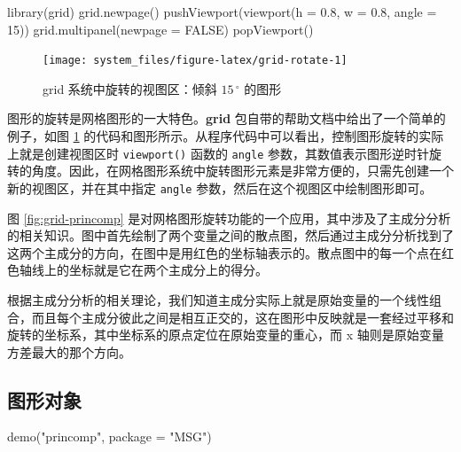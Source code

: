 \documentclass[
  b5paper,
  UTF8,twoside]{book}
\newenvironment{Shaded}{\begin{snugshade}}{\end{snugshade}}
\newcommand{\AttributeTok}[1]{\textcolor[rgb]{0.77,0.63,0.00}{#1}}
\newcommand{\ConstantTok}[1]{\textcolor[rgb]{0.00,0.00,0.00}{#1}}
\newcommand{\DecValTok}[1]{\textcolor[rgb]{0.00,0.00,0.81}{#1}}
\newcommand{\FloatTok}[1]{\textcolor[rgb]{0.00,0.00,0.81}{#1}}
\newcommand{\FunctionTok}[1]{\textcolor[rgb]{0.00,0.00,0.00}{#1}}
\newcommand{\NormalTok}[1]{#1}
\newcommand{\StringTok}[1]{\textcolor[rgb]{0.31,0.60,0.02}{#1}}
\begin{document}
\begin{Shaded}
\begin{Highlighting}[]
\FunctionTok{library}\NormalTok{(grid)}
\FunctionTok{grid.newpage}\NormalTok{()}
\FunctionTok{pushViewport}\NormalTok{(}\FunctionTok{viewport}\NormalTok{(}\AttributeTok{h =} \FloatTok{0.8}\NormalTok{, }\AttributeTok{w =} \FloatTok{0.8}\NormalTok{, }\AttributeTok{angle =} \DecValTok{15}\NormalTok{))}
\FunctionTok{grid.multipanel}\NormalTok{(}\AttributeTok{newpage =} \ConstantTok{FALSE}\NormalTok{)}
\FunctionTok{popViewport}\NormalTok{()}
\end{Highlighting}
\end{Shaded}

\begin{figure}

{\centering \texttt{[image: system\_files/figure-latex/grid-rotate-1]} 

}

\caption[grid 系统中旋转的视图区]{grid 系统中旋转的视图区：倾斜 \(15\,^{\circ}\) 的图形}\label{fig:grid-rotate}
\end{figure}





图形的旋转是网格图形的一大特色。\textbf{grid} 包自带的帮助文档中给出了一个简单的例子，如图 \ref{fig:grid-rotate} 的代码和图形所示。从程序代码中可以看出，控制图形旋转的实际上就是创建视图区时 \texttt{viewport()} 函数的 \texttt{angle} 参数，其数值表示图形逆时针旋转的角度。因此，在网格图形系统中旋转图形元素是非常方便的，只需先创建一个新的视图区，并在其中指定 \texttt{angle} 参数，然后在这个视图区中绘制图形即可。

图 \ref{fig:grid-princomp} 是对网格图形旋转功能的一个应用，其中涉及了主成分分析的相关知识。图中首先绘制了两个变量之间的散点图，然后通过主成分分析找到了这两个主成分的方向，在图中是用红色的坐标轴表示的。散点图中的每一个点在红色轴线上的坐标就是它在两个主成分上的得分。

根据主成分分析的相关理论，我们知道主成分实际上就是原始变量的一个线性组合，而且每个主成分彼此之间是相互正交的，这在图形中反映就是一套经过平移和旋转的坐标系，其中坐标系的原点定位在原始变量的重心，而 x 轴则是原始变量方差最大的那个方向。

\hypertarget{ux56feux5f62ux5bf9ux8c61}{%
\subsection{图形对象}\label{ux56feux5f62ux5bf9ux8c61}}

\begin{Shaded}
\begin{Highlighting}[]
\FunctionTok{demo}\NormalTok{(}\StringTok{"princomp"}\NormalTok{, }\AttributeTok{package =} \StringTok{"MSG"}\NormalTok{)}
\end{Highlighting}
\end{Shaded}
\end{document}
